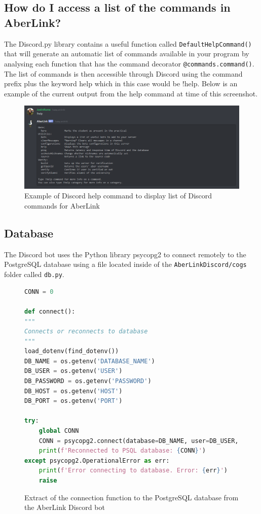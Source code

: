 \subsection{How do I access a list of the commands in AberLink?}
The Discord.py library contains a useful function called \verb|DefaultHelpCommand()| that will generate an automatic list of commands available in your program by analysing each function that has the command decorator \verb|@commands.command()|. The list of commands is then accessible through Discord using the command prefix plus the keyword help which in this case would be !help. Below is an example of the current output from the help command at time of this screenshot.  

\begin{figure}[H]
	\centering
	\includegraphics[width=1\linewidth]{Figures/discord-help.png}
	\caption{Example of Discord help command to display list of Discord commands for AberLink}
	\label{fig:discord-help}
\end{figure}

\subsection{Database}
The Discord bot uses the Python library psycopg2 \cite{psycopg2} to connect remotely to the PostgreSQL \cite{psql} database using a file located inside of the \verb|AberLinkDiscord/cogs| folder called \verb|db.py|.

\begin{figure}[H]
\begin{lstlisting}[language=Python]
CONN = 0

def connect():
"""
Connects or reconnects to database
"""
load_dotenv(find_dotenv())
DB_NAME = os.getenv('DATABASE_NAME')
DB_USER = os.getenv('USER')
DB_PASSWORD = os.getenv('PASSWORD')
DB_HOST = os.getenv('HOST')
DB_PORT = os.getenv('PORT')

try:
	global CONN
	CONN = psycopg2.connect(database=DB_NAME, user=DB_USER, password=DB_PASSWORD, host=DB_HOST, port=DB_PORT)
	print(f'Reconnected to PSQL database: {CONN}')
except psycopg2.OperationalError as err:
	print(f'Error connecting to database. Error: {err}')
	raise
\end{lstlisting}
\caption{Extract of the connection function to the PostgreSQL database from the AberLink Discord bot}
\label{fig:discord-database}
\end{figure}

